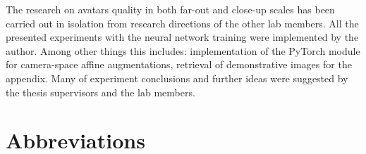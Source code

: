 The research on avatars quality in both far-out and close-up scales has been carried out in isolation from research directions of the other lab members. All the presented experiments with the neural network training were implemented by the author. Among other things this includes: implementation of the PyTorch module for camera-space affine augmentations, retrieval of demonstrative images for the appendix. Many of experiment conclusions and further ideas were suggested by the thesis supervisors and the lab members.
 
\newpage
\section*{\centering Abbreviations}

